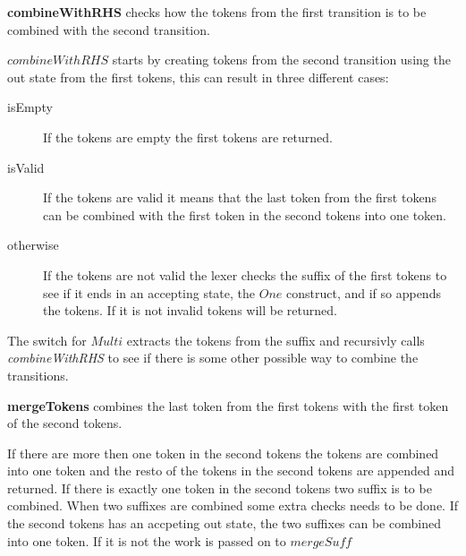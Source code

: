 \textbf{combineWithRHS} checks how the tokens from the first
transition is to be combined with the second transition.

$combineWithRHS$ starts by creating tokens from the second transition using the
out state from the first tokens, this can result in three different cases:
\begin{description}
\item[isEmpty]If the tokens are empty the first tokens are returned.
\item[isValid]If the tokens are valid it means that the last token from the
first tokens can be combined with the first token in the second tokens into one
token.
\item[otherwise]If the tokens are not valid the lexer checks the suffix of the
first tokens to see if it ends in an accepting state, the $One$ construct, and
if so appends the tokens. If it is not invalid tokens will be returned.
\end{description}
The switch for $Multi$ extracts the tokens from the suffix and recursivly calls
\emph{combineWithRHS} to see if there is some other possible way to combine the
transitions.

\textbf{mergeTokens} combines the last token from the first tokens with
the first token of the second tokens.

If there are more then one token in the second tokens the tokens are combined
into one token and the resto of the tokens in the second tokens are appended and
returned. If there is exactly one token in the second tokens two suffix is to be
combined. When two suffixes are combined some extra checks needs to be done.
If the second tokens has an accpeting out state, the two suffixes can be
combined into one token. If it is not the work is passed on to $mergeSuff$

